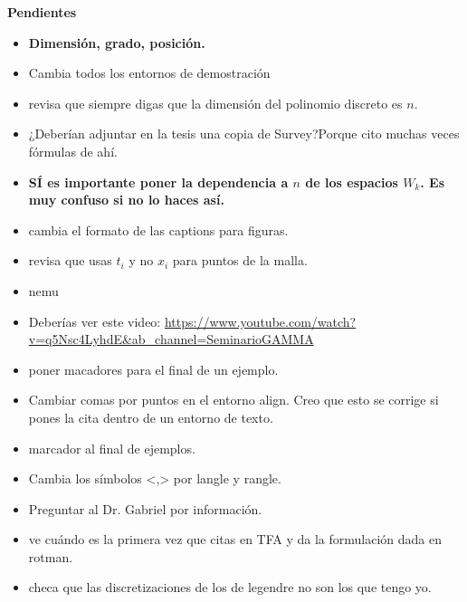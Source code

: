 \textbf{Pendientes}
\begin{itemize}

\item \textbf{Dimensión, grado, posición.}
\item Cambia todos los entornos de demostración

\item revisa que siempre digas que la dimensión
del polinomio discreto es $n$.

\item ¿Deberían adjuntar en la tesis una copia de Survey?Porque
cito muchas veces fórmulas de ahí.  

\item \textbf{SÍ es importante poner la dependencia a $n$ de los espacios
$W_{k}$. Es muy confuso si no lo haces así.}

\item cambia el formato de las captions para figuras.

\item revisa que usas $t_{i}$ y no $x_{i}$ para puntos
de la malla.

\item nemu

\item Deberías ver este video:  \url{https://www.youtube.com/watch?v=q5Nsc4LyhdE&ab_channel=SeminarioGAMMA}

\item poner macadores para el final de un ejemplo.

\item Cambiar comas por puntos en el entorno align. Creo que
esto se corrige si pones la cita dentro de un entorno
de texto.

\item marcador al final de ejemplos. \final

\item Cambia los símbolos <,> por langle y rangle.

\item Preguntar al Dr. Gabriel por información.

\item ve cuándo es la primera vez que citas en TFA y da la
formulación dada en rotman.


\item checa que las discretizaciones de los de legendre no son
los que tengo yo.

\end{itemize}

\newpage